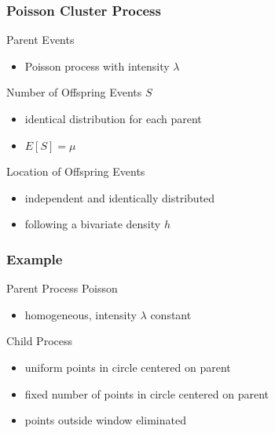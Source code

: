 \documentclass[nototal,handout]{beamer}
\begin{document}
 \begin{frame}[<+->]
   \frametitle{Poisson Cluster Process}
   \begin{block}{Parent Events}
     \begin{itemize}
       \item Poisson process with intensity $\lambda$
     \end{itemize}
    \end{block}

    \begin{block}{Number of Offspring Events $S$}
      \begin{itemize}
	\item identical distribution for each parent
	\item $E[S] = \mu$
      \end{itemize}
     \end{block}

    \begin{block}{Location of Offspring Events}
      \begin{itemize}
	\item independent and identically distributed
	\item following a bivariate density $h$ 
      \end{itemize}
     \end{block}
  \end{frame}

\begin{frame}
  \frametitle{Example}
  \begin{block}{Parent Process Poisson}
    \begin{itemize}
      \item homogeneous, intensity $\lambda$ constant
    \end{itemize}
   \end{block}
 \begin{block}{Child Process }
    \begin{itemize}
      \item uniform points in circle centered on parent
      \item fixed number of points in circle centered on parent
      \item points outside window eliminated
    \end{itemize}
   \end{block}
\end{frame}
\end{document}
